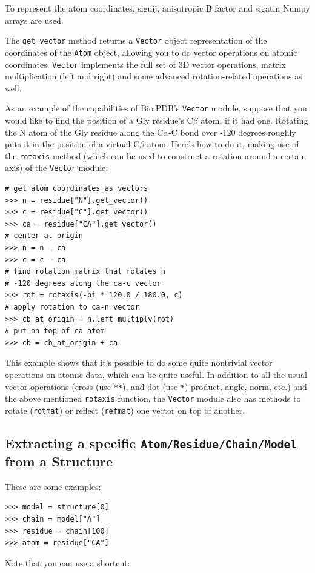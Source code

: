 To represent the atom coordinates, siguij, anisotropic B factor and sigatm Numpy
arrays are used.

The \texttt{get\_vector} method returns a \texttt{Vector} object representation of the coordinates of the \texttt{Atom} object, allowing you to do vector operations on atomic coordinates. \texttt{Vector} implements the full set of 3D vector operations, matrix multiplication (left and right) and some advanced rotation-related operations as well.

As an example of the capabilities of Bio.PDB's \texttt{Vector} module,
suppose that you would like to find the position of a Gly residue's C$\beta$
atom, if it had one. Rotating the N atom of
the Gly residue along the C$\alpha$-C bond over -120 degrees roughly
puts it in the position of a virtual C$\beta$ atom. Here's how to
do it, making use of the \texttt{rotaxis} method (which can be used
to construct a rotation around a certain axis) of the \texttt{Vector}
module:

\begin{verbatim}
# get atom coordinates as vectors
>>> n = residue["N"].get_vector()
>>> c = residue["C"].get_vector()
>>> ca = residue["CA"].get_vector()
# center at origin
>>> n = n - ca
>>> c = c - ca
# find rotation matrix that rotates n
# -120 degrees along the ca-c vector
>>> rot = rotaxis(-pi * 120.0 / 180.0, c)
# apply rotation to ca-n vector
>>> cb_at_origin = n.left_multiply(rot)
# put on top of ca atom
>>> cb = cb_at_origin + ca
\end{verbatim}
This example shows that it's possible to do some quite nontrivial
vector operations on atomic data, which can be quite useful. In addition
to all the usual vector operations (cross (use \texttt{{*}{*}}), and
dot (use \texttt{{*}}) product, angle, norm, etc.) and the above mentioned
\texttt{rotaxis} function, the \texttt{Vector} module also has methods
to rotate (\texttt{rotmat}) or reflect (\texttt{refmat}) one vector
on top of another.

\subsection{Extracting a specific \texttt{Atom/\-Residue/\-Chain/\-Model}
from a Structure}

These are some examples:

\begin{verbatim}
>>> model = structure[0]
>>> chain = model["A"]
>>> residue = chain[100]
>>> atom = residue["CA"]
\end{verbatim}
Note that you can use a shortcut:

